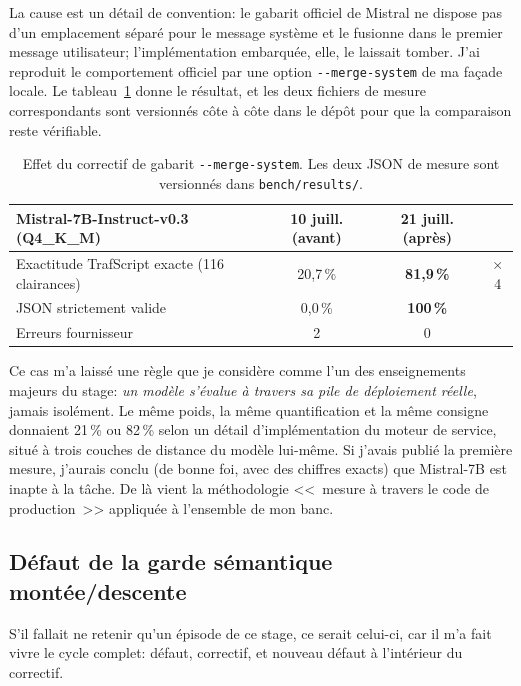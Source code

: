 \documentclass[11pt,a4paper]{article}
\begin{document}
La cause est un détail de convention: le gabarit officiel de Mistral ne dispose pas d'un emplacement séparé pour le message système et le fusionne dans le premier message utilisateur; l'implémentation embarquée, elle, le laissait tomber. J'ai reproduit le comportement officiel par une option \texttt{-{}-merge-system} de ma façade locale. Le tableau~\ref{tab:merge} donne le résultat, et les deux fichiers de mesure correspondants sont versionnés côte à côte dans le dépôt pour que la comparaison reste vérifiable.

\begin{table}[!htbp]
\centering
\caption[Effet du correctif de gabarit \texttt{-{}-merge-system}]{Effet du correctif de gabarit \texttt{-{}-merge-system}. Les deux JSON de mesure
sont versionnés dans \texttt{bench/results/}.}
\label{tab:merge}
\small
\begin{tabular}{lccc}
\toprule
\rowcolor{lightgray}\textbf{Mistral-7B-Instruct-v0.3 (Q4\_K\_M)} & \textbf{10 juill. (avant)} & \textbf{21 juill. (après)} & \\
\midrule
Exactitude TrafScript exacte (116 clairances) & 20,7\,\% & \textbf{81,9\,\%} & $\times$4\\
JSON strictement valide & 0,0\,\% & \textbf{100\,\%} & \\
Erreurs fournisseur & 2 & 0 & \\
\bottomrule
\end{tabular}
\end{table}

Ce cas m'a laissé une règle que je considère comme l'un des enseignements majeurs du stage: \emph{un modèle s'évalue à travers sa pile de déploiement réelle}, jamais isolément. Le même poids, la même quantification et la même consigne donnaient 21\,\% ou 82\,\% selon un détail d'implémentation du moteur de service, situé à trois couches de distance du modèle lui-même. Si j'avais publié la première mesure, j'aurais conclu (de bonne foi, avec des chiffres exacts) que Mistral-7B est inapte à la tâche. De là vient la méthodologie <<~mesure à travers le code de production~>> appliquée à l'ensemble de mon banc. 

\subsection{Défaut de la garde sémantique montée/descente}
\label{sec:garde}

S'il fallait ne retenir qu'un épisode de ce stage, ce serait celui-ci, car il m'a fait vivre le cycle complet: défaut, correctif, et nouveau défaut à l'intérieur du correctif.
\end{document}
